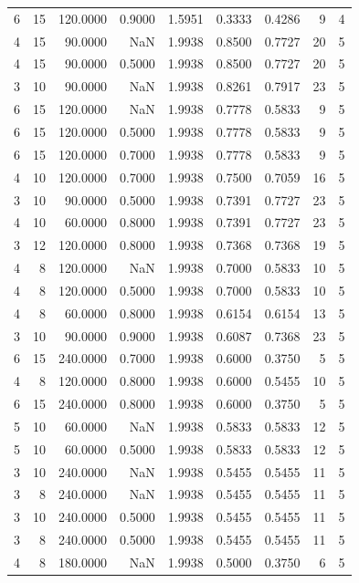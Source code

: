 \begin{tabular}{rrrrrrrrr}
6 & 15 & 120.0000 & 0.9000 & 1.5951 & 0.3333 & 0.4286 & 9 & 4 \\
4 & 15 & 90.0000 & NaN & 1.9938 & 0.8500 & 0.7727 & 20 & 5 \\
4 & 15 & 90.0000 & 0.5000 & 1.9938 & 0.8500 & 0.7727 & 20 & 5 \\
3 & 10 & 90.0000 & NaN & 1.9938 & 0.8261 & 0.7917 & 23 & 5 \\
6 & 15 & 120.0000 & NaN & 1.9938 & 0.7778 & 0.5833 & 9 & 5 \\
6 & 15 & 120.0000 & 0.5000 & 1.9938 & 0.7778 & 0.5833 & 9 & 5 \\
6 & 15 & 120.0000 & 0.7000 & 1.9938 & 0.7778 & 0.5833 & 9 & 5 \\
4 & 10 & 120.0000 & 0.7000 & 1.9938 & 0.7500 & 0.7059 & 16 & 5 \\
3 & 10 & 90.0000 & 0.5000 & 1.9938 & 0.7391 & 0.7727 & 23 & 5 \\
4 & 10 & 60.0000 & 0.8000 & 1.9938 & 0.7391 & 0.7727 & 23 & 5 \\
3 & 12 & 120.0000 & 0.8000 & 1.9938 & 0.7368 & 0.7368 & 19 & 5 \\
4 & 8 & 120.0000 & NaN & 1.9938 & 0.7000 & 0.5833 & 10 & 5 \\
4 & 8 & 120.0000 & 0.5000 & 1.9938 & 0.7000 & 0.5833 & 10 & 5 \\
4 & 8 & 60.0000 & 0.8000 & 1.9938 & 0.6154 & 0.6154 & 13 & 5 \\
3 & 10 & 90.0000 & 0.9000 & 1.9938 & 0.6087 & 0.7368 & 23 & 5 \\
6 & 15 & 240.0000 & 0.7000 & 1.9938 & 0.6000 & 0.3750 & 5 & 5 \\
4 & 8 & 120.0000 & 0.8000 & 1.9938 & 0.6000 & 0.5455 & 10 & 5 \\
6 & 15 & 240.0000 & 0.8000 & 1.9938 & 0.6000 & 0.3750 & 5 & 5 \\
5 & 10 & 60.0000 & NaN & 1.9938 & 0.5833 & 0.5833 & 12 & 5 \\
5 & 10 & 60.0000 & 0.5000 & 1.9938 & 0.5833 & 0.5833 & 12 & 5 \\
3 & 10 & 240.0000 & NaN & 1.9938 & 0.5455 & 0.5455 & 11 & 5 \\
3 & 8 & 240.0000 & NaN & 1.9938 & 0.5455 & 0.5455 & 11 & 5 \\
3 & 10 & 240.0000 & 0.5000 & 1.9938 & 0.5455 & 0.5455 & 11 & 5 \\
3 & 8 & 240.0000 & 0.5000 & 1.9938 & 0.5455 & 0.5455 & 11 & 5 \\
4 & 8 & 180.0000 & NaN & 1.9938 & 0.5000 & 0.3750 & 6 & 5 \\

\end{tabular}

